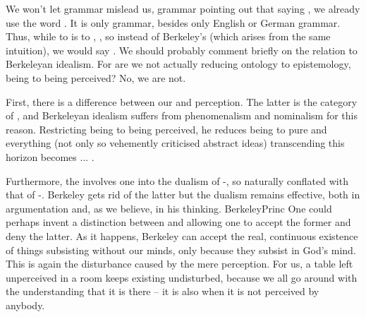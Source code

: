 \label{sub:Berkeley}

\pa
We won't let grammar mislead us, grammar pointing out that saying
, we already use the word .  It is only
grammar, besides only English or German grammar.
%
Thus, while to  is to , , so instead of Berkeley's  (which arises from the
same intuition), we would say .
We should probably comment  briefly on the relation to Berkeleyan
idealism.  For are we not actually reducing ontology to epistemology, being to
being perceived? No, we are not.

First, there is a difference between our  and perception. The
latter is the category of , and Berkeleyan idealism suffers from
phenomenalism and nominalism for this reason. Restricting being to being
perceived, he reduces being to pure  and everything (not only
so vehemently criticised abstract ideas) transcending this horizon becomes
... . 

Furthermore, the  involves one into the dualism of
-, so naturally conflated with that of
-. Berkeley gets rid of the latter but the dualism remains
effective, both in argumentation and, as we believe, in his thinking.
\citet{Ideas imprinted on the sense are real things, or do really exist; this we
  do not deny, but we deny they can subsist without the minds which perceive
  them, or that they are resemblances of any archetypes existing without the
  mind;}{BerkeleyPrinc}{} One could perhaps invent a distinction
between  and  allowing one to accept the former and
deny the latter. As it happens, Berkeley can accept the real, continuous
existence of things subsisting without our minds, only because they subsist in
God's mind. This is again the disturbance caused by the mere 
perception. For us, a table left unperceived in a room keeps existing
undisturbed, because we all go around with the understanding that it is there --
it is  also when it is not  perceived by
anybody.

